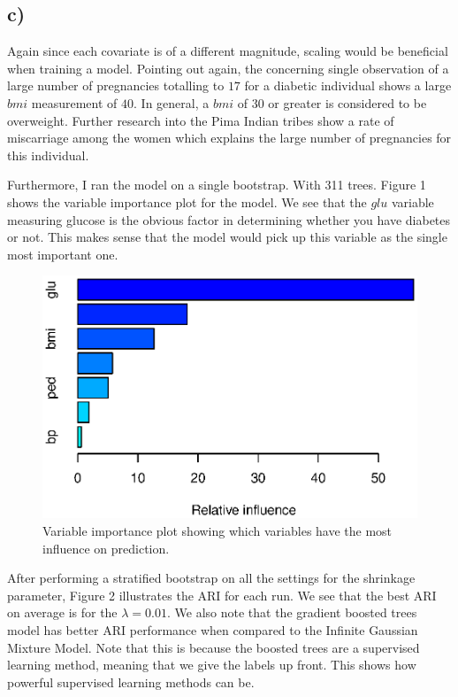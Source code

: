 \documentclass[12pt, centerh1]{article}
\begin{document}
\subsection*{c)}
Again since each covariate is of a different magnitude, scaling would be beneficial when training a model. Pointing out again, the concerning single observation of a large number of pregnancies totalling to $17$ for a diabetic individual shows a large $bmi$ measurement of $40$. In general, a $bmi$ of 30 or greater is considered to be overweight.
Further research into the Pima Indian tribes show a rate of miscarriage among the women which explains the large number of pregnancies for this individual. 

Furthermore, I ran the model on a single bootstrap. With 311 trees. Figure 1 shows the variable importance plot for the model. We see that the $glu$ variable measuring glucose is the obvious factor in determining whether you have diabetes or not. This makes sense that the model would pick up this variable as the single most important one. 

\begin{figure}[!htb]
\caption{Variable importance plot showing which variables have the most influence on prediction.}
\centering
\includegraphics[scale=0.8]{relative_influence}
\end{figure}

After performing a stratified bootstrap on all the settings for the shrinkage parameter, Figure 2 illustrates the ARI for each run. We see that the best ARI on average is for the $\lambda = 0.01$. We also note that the gradient boosted trees model has better ARI performance when compared to the Infinite Gaussian Mixture Model. Note that this is because the boosted trees are a supervised learning method, meaning that we give the labels up front. This shows how powerful supervised learning methods can be. 
\end{document}

